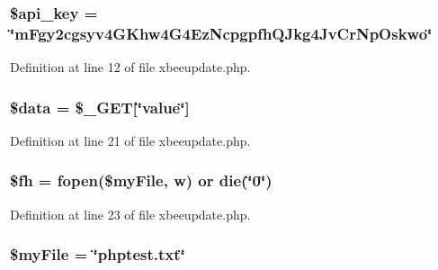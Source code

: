 \subsubsection[{\texorpdfstring{\$api\+\_\+key}{$api_key}}]{\setlength{\rightskip}{0pt plus 5cm}\$api\+\_\+key = \char`\"{}m\+Fgy2cgsyv4\+G\+Khw4\+G4\+Ez\+Ncpgpfh\+Q\+Jkg4\+Jv\+Cr\+Np\+Oskwo\char`\"{}}\hypertarget{xbeeupdate_8php_a186dfe06d14a3bc248c4eb4bcdaec562}{}\label{xbeeupdate_8php_a186dfe06d14a3bc248c4eb4bcdaec562}


Definition at line 12 of file xbeeupdate.\+php.

\subsubsection[{\texorpdfstring{\$data}{$data}}]{\setlength{\rightskip}{0pt plus 5cm}\$data = \$\+\_\+\+G\+ET\mbox{[}\char`\"{}value\char`\"{}\mbox{]}}\hypertarget{xbeeupdate_8php_a6efc15b5a2314dd4b5aaa556a375c6d6}{}\label{xbeeupdate_8php_a6efc15b5a2314dd4b5aaa556a375c6d6}


Definition at line 21 of file xbeeupdate.\+php.

\subsubsection[{\texorpdfstring{\$fh}{$fh}}]{\setlength{\rightskip}{0pt plus 5cm}\$fh = fopen(\$my\+File, \textquotesingle{}w\textquotesingle{}) or die(\char`\"{}0\char`\"{})}\hypertarget{xbeeupdate_8php_a015aa0bda28030cbf1a64c0afb88f958}{}\label{xbeeupdate_8php_a015aa0bda28030cbf1a64c0afb88f958}


Definition at line 23 of file xbeeupdate.\+php.

\subsubsection[{\texorpdfstring{\$my\+File}{$myFile}}]{\setlength{\rightskip}{0pt plus 5cm}\$my\+File = \char`\"{}phptest.\+txt\char`\"{}}\hypertarget{xbeeupdate_8php_aec8c77a99462294dbbfb1639bd8b5165}{}\label{xbeeupdate_8php_aec8c77a99462294dbbfb1639bd8b5165}


